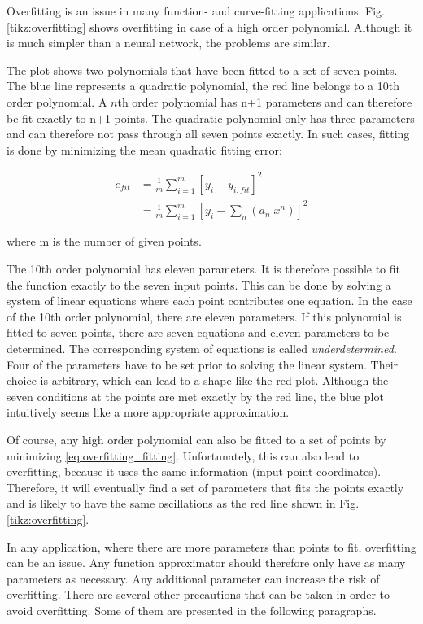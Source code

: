 Overfitting is an issue in many function- and curve-fitting applications. Fig. \ref{tikz:overfitting} shows overfitting in case of a high order polynomial. Although it is much simpler than a neural network, the problems are similar.

The plot shows two polynomials that have been fitted to a set of seven points. The blue line represents a quadratic polynomial, the red line belongs to a 10th order polynomial. A $n$th order polynomial has n+1 parameters and can therefore be fit exactly to n+1 points. The quadratic polynomial only has three parameters and can therefore not pass through all seven points exactly. In such cases, fitting is done by minimizing the mean quadratic fitting error: 

\begin{align}
\bar{e}_{fit}&=\frac{1}{m}\sum_{i=1}^{m}[y_i-y_{i,fit}]^2 \\
&=\frac{1}{m}\sum_{i=1}^{m}[y_i-\sum_n (a_n\;x^n)]^2
\label{eq:overfitting_fitting}
\end{align}

where m is the number of given points. 

The 10th order polynomial has eleven parameters. It is therefore possible to fit the function exactly to the seven input points. This can be done by solving a system of linear equations where each point contributes one equation. In the case of the 10th order polynomial, there are eleven parameters. If this polynomial is fitted to seven points, there are seven equations and eleven parameters to be determined. The corresponding system of equations is called \textit{underdetermined}. Four of the parameters have to be set prior to solving the linear system. Their choice is arbitrary, which can lead to a shape like the red plot. Although the seven conditions at the points are met exactly by the red line, the blue plot intuitively seems like a more appropriate approximation.

Of course, any high order polynomial can also be fitted to a set of points by minimizing \ref{eq:overfitting_fitting}. Unfortunately, this can also lead to overfitting, because it uses the same information (input point coordinates). Therefore, it will eventually find a set of parameters that fits the points exactly and is likely to have the same oscillations as the red line shown in Fig. \ref{tikz:overfitting}.

In any application, where there are more parameters than points to fit, overfitting can be an issue. Any function approximator should therefore only have as many parameters as necessary. Any additional parameter can increase the risk of overfitting. There are several other precautions that can be taken in order to avoid overfitting. Some of them are presented in the following paragraphs. \bigbreak

